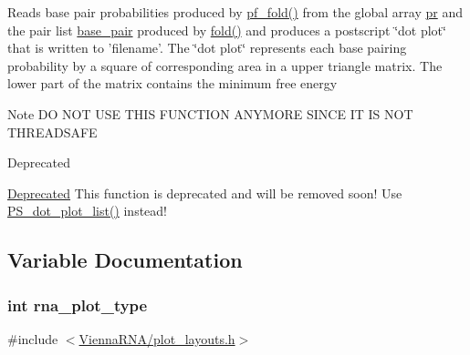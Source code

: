 Reads base pair probabilities produced by \hyperlink{group__pf__fold_gadc3db3d98742427e7001a7fd36ef28c2}{pf\-\_\-fold()} from the global array \hyperlink{fold__vars_8h_ac98ec419070aee6831b44e5c700f090f}{pr} and the pair list \hyperlink{fold__vars_8h_a0244a629b5ab4f58b77590c3dfd130dc}{base\-\_\-pair} produced by \hyperlink{group__mfe__fold__single_gaadafcb0f140795ae62e5ca027e335a9b}{fold()} and produces a postscript \char`\"{}dot plot\char`\"{} that is written to 'filename'. The \char`\"{}dot plot\char`\"{} represents each base pairing probability by a square of corresponding area in a upper triangle matrix. The lower part of the matrix contains the minimum free energy \begin{DoxyNote}{Note}
D\-O N\-O\-T U\-S\-E T\-H\-I\-S F\-U\-N\-C\-T\-I\-O\-N A\-N\-Y\-M\-O\-R\-E S\-I\-N\-C\-E I\-T I\-S N\-O\-T T\-H\-R\-E\-A\-D\-S\-A\-F\-E
\end{DoxyNote}
\begin{DoxyRefDesc}{Deprecated}
\item[\hyperlink{deprecated__deprecated000123}{Deprecated}]This function is deprecated and will be removed soon! Use \hyperlink{group__plotting__utils_ga00ea223b5cf02eb2faae5ff29f0d5e12}{P\-S\-\_\-dot\-\_\-plot\-\_\-list()} instead! \end{DoxyRefDesc}


\subsection{Variable Documentation}
\hypertarget{group__plotting__utils_ga5964c4581431b098b80027d6e14dcdd4}{
\subsubsection[{rna\-\_\-plot\-\_\-type}]{\setlength{\rightskip}{0pt plus 5cm}int rna\-\_\-plot\-\_\-type}}\label{group__plotting__utils_ga5964c4581431b098b80027d6e14dcdd4}


{\ttfamily \#include $<$\hyperlink{plot__layouts_8h}{Vienna\-R\-N\-A/plot\-\_\-layouts.\-h}$>$}



